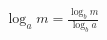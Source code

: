 \documentclass[preview]{standalone}
\begin{document}
\begin{align*}
\log_{a}{m}=\frac{\log_{b}{m}}{\log_{b}{a}}
\end{align*}
\end{document}
